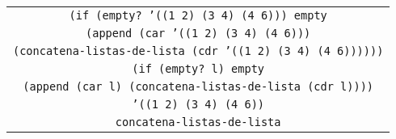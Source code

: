 \documentclass[letterpaper,11pt]{article}
\begin{document}
\begin{enumerate}
\begin{enumerate}
\begin{center}
\begin{tabular}{|c|}
                \texttt{(if (empty? '((1 2) (3 4) (4 6))) empty} \\
                \texttt{(append (car '((1 2) (3 4) (4 6)))} \\
                \texttt{(concatena-listas-de-lista 
                (cdr '((1 2) (3 4) (4 6))))))} \\
                \hline
                \texttt{(if (empty? l) empty} \\
                \texttt{(append (car l) (concatena-listas-de-lista (cdr l))))} \\
                \hline
                \texttt{'((1 2) (3 4) (4 6))} \\
                \hline
                \texttt{concatena-listas-de-lista} \\
                \hline
            \end{tabular}
        \end{center}


\end{enumerate}
\end{enumerate}
\end{document}
